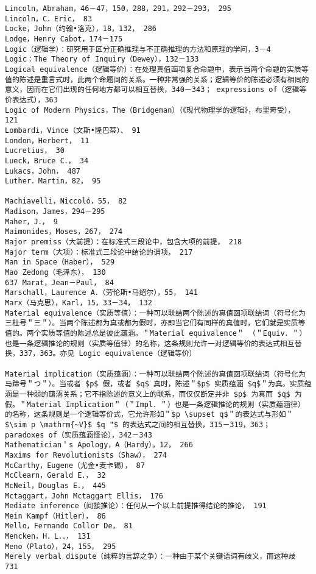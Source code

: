 \begin{verbatim}
Lincoln，Abraham，46－47，150，288，291，292－293， 295
Lincoln，C．Eric， 83
Locke，John（约翰•洛克），18，132， 286
Lodge，Henry Cabot，174－175
Logic（逻辑学）：研究用于区分正确推理与不正确推理的方法和原理的学问，3－4
Logic：The Theory of Inquiry（Dewey），132－133
Logical equivalence（逻辑等价）：在处理真值函项复合命题中，表示当两个命题的实质等值的陈述是重言式时，此两个命题间的关系。一种非常强的关系；逻辑等价的陈述必须有相同的意义，因而在它们出现的任何地方都可以相互替换，340－343； expressions of（逻辑等价表达式），363
Logic of Modern Physics，The（Bridgeman）（《现代物理学的逻辑》，布里奇受）， 121
Lombardi，Vince（文斯•隆巴蒂）、 91
London，Herbert， 11
Lucretius， 30
Lueck，Bruce C．， 34
Lukacs，John， 487
Luther．Martin，82， 95

Machiavelli，Niccoló，55， 82
Madison，James，294－295
Maher，J．， 9
Maimonides，Moses，267， 274
Major premiss（大前提）：在标准式三段论中，包含大项的前提， 218
Major term（大项）：标准式三段论中结论的谓项， 217
Man in Space（Haber）， 529
Mao Zedong（毛泽东）， 130
637 Marat，Jean－Paul， 84
Marschall，Laurence A．（劳伦斯•马绍尔），55， 141
Marx（马克思），Karl，15，33－34， 132
Material equivalence（实质等值）：一种可以联结两个陈述的真值函项联结词（符号化为三杜号＂三＂）。当两个陈述都为真或都为假时，亦即当它们有同样的真值时，它们就是实质等值的。两个实质等值的陈述总是彼此蕴涵。＂Material equivalence＂ （＂Equiv．＂）也是一条逻辑推论的规则（实质等值律）的名称，这条规则允许一对逻辑等价的表达式相互替换，337，363。亦见 Logic equivalence（逻辑等价）

Material implication（实质蕴涵）：一种可以联结两个陈述的真值函项联结词（符号化为马蹄号＂つ＂）。当或者 $p$ 假，或者 $q$ 真时，陈述＂$p$ 实质蕴涵 $q$＂为真。实质蕴涵是一种弱的蕴涵关系；它不指陈述的意义上的联系，而仅仅断定并非 $p$ 为真而 $q$ 为假。＂Material Implication＂（＂Impl．＂）也是一条逻辑推论的规则（实质蕴涵律）的名称，这条规则是一个逻辑等价式，它允许形如＂$p \supset q$＂的表达式与形如＂$\sim p \mathrm{~V}$ $q "$ 的表达式之间的相互替换，315－319，363；
paradoxes of（实质蕴涵怪论），342－343
Mathematician＇s Apology，A（Hardy），12， 266
Maxims for Revolutionists（Shaw）， 274
McCarthy，Eugene（尤金•麦卡锡）， 87
McClearn，Gerald E．， 32
McNeil，Douglas E．， 445
Mctaggart，John Mctaggart Ellis， 176
Mediate inference（间接推论）：任何从一个以上前提推得结论的推论， 191
Mein Kampf（Hitler）， 86
Mello，Fernando Collor De， 81
Mencken，H．L．．， 131
Meno（Plato），24，155， 295
Merely verbal dispute（纯粹的言辞之争）：一种由于某个关键语词有歧义，而这种歧 731


\end{verbatim}
